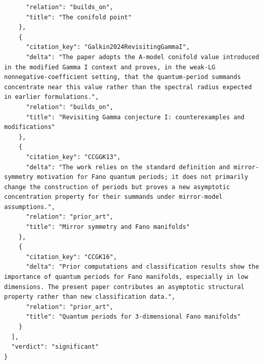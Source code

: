 \documentclass[11pt]{article}
\begin{document}
\begin{verbatim}
      "relation": "builds_on",
      "title": "The conifold point"
    },
    {
      "citation_key": "Galkin2024RevisitingGammaI",
      "delta": "The paper adopts the A-model conifold value introduced in the modified Gamma I context and proves, in the weak-LG nonnegative-coefficient setting, that the quantum-period summands concentrate near this value rather than the spectral radius expected in earlier formulations.",
      "relation": "builds_on",
      "title": "Revisiting Gamma conjecture I: counterexamples and modifications"
    },
    {
      "citation_key": "CCGGK13",
      "delta": "The work relies on the standard definition and mirror-symmetry motivation for Fano quantum periods; it does not primarily change the construction of periods but proves a new asymptotic concentration property for their summands under mirror-model assumptions.",
      "relation": "prior_art",
      "title": "Mirror symmetry and Fano manifolds"
    },
    {
      "citation_key": "CCGK16",
      "delta": "Prior computations and classification results show the importance of quantum periods for Fano manifolds, especially in low dimensions. The present paper contributes an asymptotic structural property rather than new classification data.",
      "relation": "prior_art",
      "title": "Quantum periods for 3-dimensional Fano manifolds"
    }
  ],
  "verdict": "significant"
}
\end{verbatim}
\end{document}

